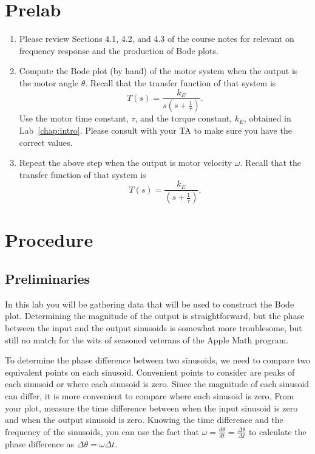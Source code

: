 \section{Prelab}\label{sec:prelab4}

\begin{enumerate}
\item Please review Sections 4.1, 4.2, and 4.3 of the course notes for relevant on frequency
response and the production of Bode plots.
\item Compute the Bode plot (by hand) of the motor system when the output is
the motor angle $\theta$.  Recall that the transfer function of that system
is
\begin{equation*}
T(s) =\frac{k_{E}}{s(s+\frac{1}{\tau})}.
\end{equation*}
Use the motor time constant, $\tau$, and the torque constant, $k_{E}$\@,
obtained in Lab~\ref{chap:intro}\@.  Please consult with your TA to make sure
you have the correct values.
\item Repeat the above step when the output is motor velocity $\omega$.
Recall that the transfer function of that system is
\begin{equation*}
T(s) =\frac{k_{E}}{(s+\frac{1}{\tau})}.
\end{equation*}
\end{enumerate}

\section{Procedure}

\subsection{Preliminaries}

In this lab you will be gathering data that will be used to construct the
Bode plot.  Determining the magnitude of the output is straightforward, but
the phase between the input and the output sinusoids is somewhat more
troublesome, but still no match for the wits of seasoned veterans of the
Apple Math program.

To determine the phase difference between two sinusoids, we need to compare
two equivalent points on each sinusoid. Convenient points to consider are
peaks of each sinusoid or where each sinusoid is zero.  Since the magnitude
of each sinusoid can differ, it is more convenient to compare where each
sinusoid is zero. From your plot, measure the time difference between when
the input sinusoid is zero and when the output sinusoid is zero.  Knowing the
time difference and the frequency of the sinusoids, you can use the fact that
$\omega=\frac{d\theta}{dt}=\frac{\Delta\theta}{\Delta t}$ to calculate the
phase difference as $\Delta\theta=\omega\Delta t$\@.

